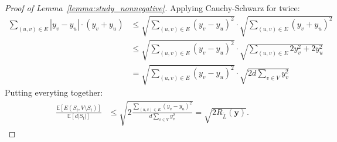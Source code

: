 \documentclass[a4paper]{article}
\theoremstyle{definition}
\begin{document}
\begin{proof}[Proof of Lemma~\ref{lemma:study_nonnegative}]
Applying Cauchy-Schwarz for twice:
\begin{align}
    \sum_{(u, v)\in E}|y_v-y_u|\cdot (y_v+y_u) &\leq \sqrt{\sum_{(u, v)\in E}(y_v-y_u)^2}\cdot \sqrt{\sum_{(u, v)\in E}(y_v+y_u)^2}\\
    &\leq \sqrt{\sum_{(u, v)\in E}(y_v-y_u)^2}\cdot\sqrt{\sum_{(u, v)\in E}2y_v^2+2y_u^2}\\
    &= \sqrt{\sum_{(u, v)\in E}(y_v-y_u)^2}\cdot\sqrt{2d\sum_{v\in V}y_v^2}
\end{align}
Putting everyting together:
\begin{align}
\frac{\mathbb{E}[E(S_t, V\setminus S_t)]}{\mathbb{E}[d|S_t|]} &\leq \sqrt{2\frac{\sum_{(u, v)\in E}(y_v-y_u)^2}{d\sum_{v\in V}y_v^2}}=\sqrt{2R_{\tilde{L}}(\textbf{y})}.
\end{align}

\end{proof}



\end{document}
